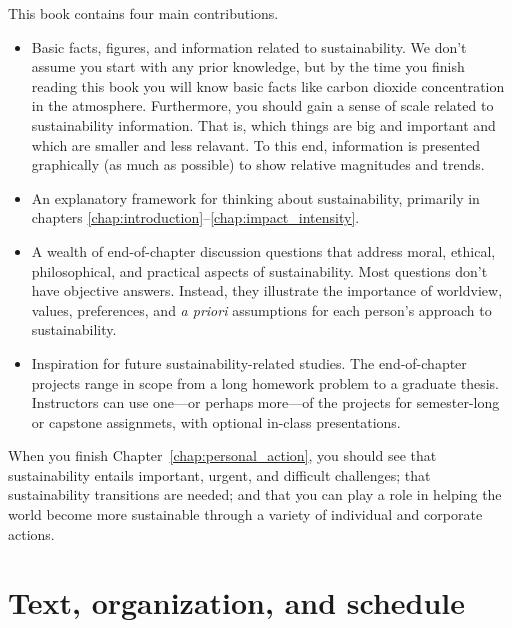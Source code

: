 {This book contains four main contributions.

\begin{itemize}

  \item Basic facts, figures, and information related to sustainability. 
        We don't assume you start with any prior knowledge, but by the time you finish 
        reading this book you will know basic facts like carbon dioxide 
        concentration in the atmosphere. 
        Furthermore, you should gain a sense of scale related to sustainability 
        information. 
        That is, which things are big and important and 
        which are smaller and less relavant. 
        To this end, information is presented graphically (as much as possible) 
        to show relative magnitudes and trends.
        
  \item An explanatory framework for thinking about sustainability,
        primarily in chapters \ref{chap:introduction}--\ref{chap:impact_intensity}.

  \item A wealth of end-of-chapter discussion questions that 
        address moral, ethical, philosophical,
        and practical aspects of sustainability. 
        Most questions don't have objective answers. 
        Instead, they illustrate the importance
        of worldview, values, preferences, and \emph{a priori} assumptions 
        for each person's approach to sustainability. 
        
  \item Inspiration for future sustainability-related studies.
        The end-of-chapter projects range in scope from a long
        homework problem to a graduate thesis. 
        Instructors can use one---or perhaps more---of the projects for
        semester-long or capstone assignmets,
        with optional in-class presentations.
      
\end{itemize}

When you finish Chapter~\ref{chap:personal_action}, you should see
that sustainability entails important, urgent, and difficult challenges; 
that sustainability transitions are needed; and 
that you can play a role in helping the world become more sustainable
through a variety of individual and corporate actions.


\section*{Text, organization, and schedule} 

}
